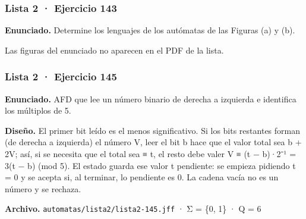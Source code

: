 
\hypertarget{lista-2-ejercicio-143}{%
\subsubsection{Lista 2 · Ejercicio 143}\label{lista-2-ejercicio-143}}

\textbf{Enunciado.} Determine los lenguajes de los autómatas de las Figuras (a) y (b).

Las figuras del enunciado no aparecen en el PDF de la lista.

\hypertarget{lista-2-ejercicio-145}{%
\subsubsection{Lista 2 · Ejercicio 145}\label{lista-2-ejercicio-145}}

\textbf{Enunciado.} AFD que lee un número binario de derecha a izquierda e identifica los múltiplos de 5.

\textbf{Diseño.} El primer bit leído es el menos significativo. Si los bits restantes forman (de derecha a izquierda) el número V, leer el bit b hace que el valor total sea b + 2V; así, si se necesita que el total sea ≡ t, el resto debe valer V ≡ (t − b)·2⁻¹ = 3(t − b) (mod 5). El estado guarda ese valor t pendiente: se empieza pidiendo t = 0 y se acepta si, al terminar, lo pendiente es 0. La cadena vacía no es un número y se rechaza.

\textbf{Archivo.} \texttt{automatas/lista2/lista2-145.jff} · Σ = \{0, 1\} · \textbar Q\textbar{} = 6


